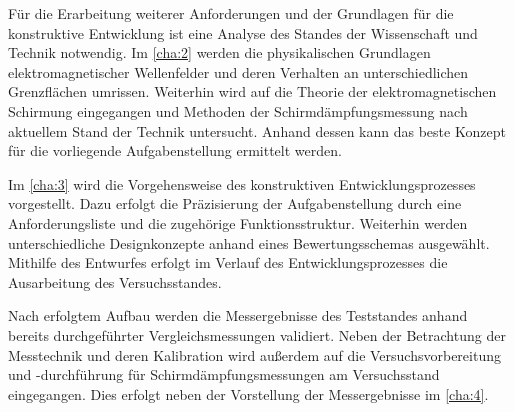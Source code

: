 Für die Erarbeitung weiterer Anforderungen und der Grundlagen für die konstruktive Entwicklung ist eine Analyse des Standes der Wissenschaft und Technik notwendig. Im \Kapitel\ref{cha:2} werden die physikalischen Grundlagen elektromagnetischer Wellenfelder und deren Verhalten an unterschiedlichen Grenzflächen umrissen. Weiterhin wird auf die Theorie der elektromagnetischen Schirmung eingegangen und Methoden der Schirmdämpfungsmessung nach aktuellem Stand der Technik untersucht. Anhand dessen kann das beste Konzept für die vorliegende Aufgabenstellung ermittelt werden.
\par
\vspace{\linespace}
Im \Kapitel\ref{cha:3} wird die Vorgehensweise des konstruktiven Entwicklungsprozesses vorgestellt. Dazu erfolgt die Präzisierung der Aufgabenstellung durch eine Anforderungsliste und die zugehörige Funktionsstruktur. Weiterhin werden unterschiedliche Designkonzepte anhand eines Bewertungsschemas ausgewählt. Mithilfe des Entwurfes erfolgt im Verlauf des Entwicklungsprozesses die Ausarbeitung des Versuchs\-standes. 
\par
\vspace{\linespace}
Nach erfolgtem Aufbau werden die Messergebnisse des Teststandes anhand bereits durchgeführter Vergleichsmessungen validiert. Neben der Betrachtung der Messtechnik und deren Kalibration wird außerdem auf die Versuchsvorbereitung und -durchführung für Schirmdämpfungsmessungen am Versuchsstand eingegangen. Dies erfolgt neben der Vorstellung der Messergebnisse im \Kapitel\ref{cha:4}.

